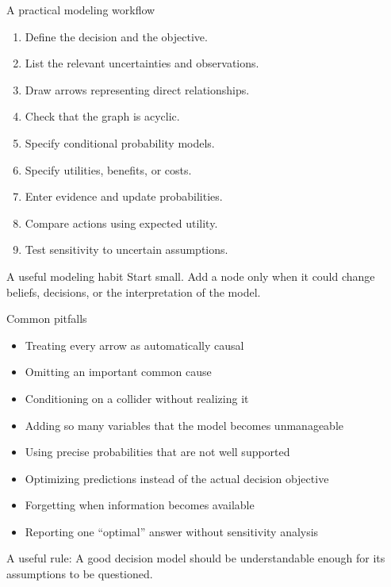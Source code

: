 \documentclass[aspectratio=43,11pt]{beamer}
\begin{document}
\begin{frame}{A practical modeling workflow}

\begin{enumerate}
  \item Define the decision and the objective.
  \item List the relevant uncertainties and observations.
  \item Draw arrows representing direct relationships.
  \item Check that the graph is acyclic.
  \item Specify conditional probability models.
  \item Specify utilities, benefits, or costs.
  \item Enter evidence and update probabilities.
  \item Compare actions using expected utility.
  \item Test sensitivity to uncertain assumptions.
\end{enumerate}

\medskip

\begin{block}{A useful modeling habit}
Start small. Add a node only when it could change beliefs, decisions,
or the interpretation of the model.
\end{block}

\end{frame}

\begin{frame}{Common pitfalls}

\begin{itemize}
  \item Treating every arrow as automatically causal
  \item Omitting an important common cause
  \item Conditioning on a collider without realizing it
  \item Adding so many variables that the model becomes unmanageable
  \item Using precise probabilities that are not well supported
  \item Optimizing predictions instead of the actual decision objective
  \item Forgetting when information becomes available
  \item Reporting one ``optimal'' answer without sensitivity analysis
\end{itemize}

\medskip

\begin{block}{A useful rule:}
A good decision model should be understandable enough for its
assumptions to be questioned.
\end{block}

\end{frame}
\end{document}
